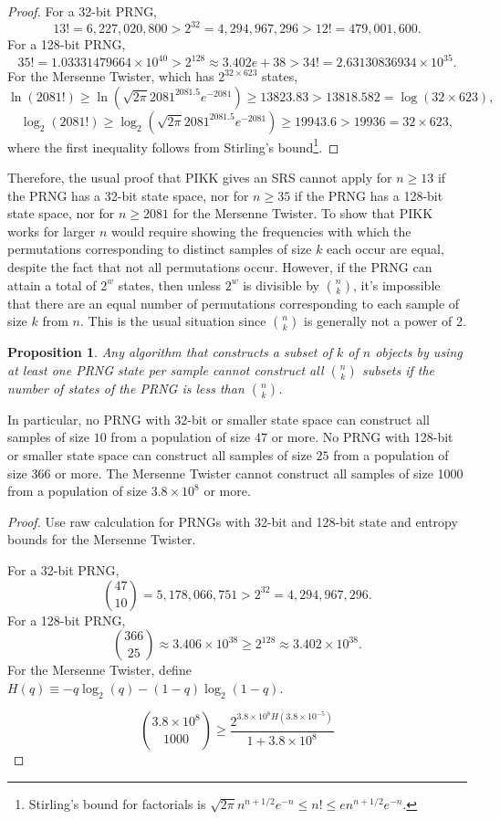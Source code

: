 \documentclass[12pt]{article}
\newtheorem{proposition}[theorem]{Proposition}
\newcommand{\todo}[1]{{\color{red}{TO DO: \sc #1}}}
\begin{document}
\begin{proof}
For a 32-bit PRNG,
$$13! = 6,227,020,800 > 2^{32} = 4,294,967,296 > 12! = 479,001,600.$$
For a 128-bit PRNG,
$$ 35! = 1.03331479664 \times 10^{40} > 2^{128} \approx 3.402e+38 > 34! = 2.63130836934 \times 10^{35}. $$
For the Mersenne Twister, which has $2^{32 \times 623}$ states, \todo{I think the following line is wrong?}
 $$ \ln (2081!) \ge \ln\left( \sqrt{2 \pi} 2081^{2081.5} e^{-2081} \right) \ge 13823.83 > 13818.582 = \log(32 \times 623),$$
 $$ \log_2(2081 !) \ge \log_2\left( \sqrt{2 \pi} 2081^{2081.5} e^{-2081} \right) \ge 19943.6 > 19936 = 32 \times 623,$$
where the first inequality follows from Stirling's bound\footnote{
Stirling's bound for factorials is $ \sqrt{2 \pi} n^{n+1/2} e^{-n} \le n! \le e n^{n+1/2} e^{-n}$.}.
\end{proof}

Therefore, the usual proof that PIKK gives an SRS cannot apply for $n \ge 13$ if the PRNG has a 32-bit state space, nor for $n \ge 35$ if the PRNG has a 128-bit state space, nor for $n \ge 2081$ for the Mersenne Twister.
To show that PIKK works for larger $n$ would require showing the frequencies with which the permutations corresponding to distinct samples of size $k$ each occur are equal, despite the fact that not all permutations occur.
However, if the PRNG can attain a total of $2^w$ states, then unless $2^w$ is divisible by ${n \choose k}$, it's impossible that there are an equal number of permutations corresponding to each sample of size $k$ from $n$. 
This is the usual situation since ${n \choose k }$ is generally not a power of 2.



\begin{proposition}
Any algorithm that constructs a subset of $k$ of $n$ objects by using at least one PRNG state per sample cannot construct all $n \choose k$ subsets if the number of states of the PRNG is less than $n \choose k$.
\end{proposition}

In particular, no PRNG with 32-bit or smaller state space can construct all samples of size $10$ from a population of size $47$ or more. 
No PRNG with 128-bit or smaller state space can construct all samples of size $25$ from a population of size $366$ or more. 
The Mersenne Twister cannot construct all samples of size 1000 from a population of size $3.8 \times 10^8$ or more.

\begin{proof}
Use raw calculation for PRNGs with 32-bit and 128-bit state and entropy bounds for the Mersenne Twister.

For a 32-bit PRNG,
$${47\choose10} = 5,178,066,751>  2^{32} = 4,294,967,296 .$$
For a 128-bit PRNG,
$${366\choose25} \approx 3.406 \times 10^{38} \ge 2^{128} \approx 3.402 \times 10^{38}.$$
For the Mersenne Twister,
define $H(q) \equiv -q\log_2(q) - (1-q)\log_2(1-q)$.

$${3.8 \times 10^8 \choose 1000} \geq \frac{2^{ 3.8 \times 10^8 H(3.8 \times 10^{-5})}}{1 + 3.8 \times 10^8}$$

\todo{flesh out}
\end{proof}
\end{document}

